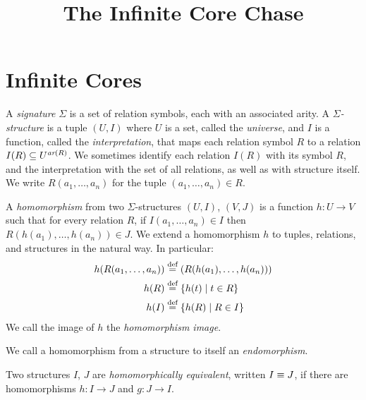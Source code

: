 \documentclass[acmsmall,screen,nonacm,review]{acmart}
\begin{document}
\title{The Infinite Core Chase}

\maketitle

\section{Infinite Cores}

\begin{definition}
    A {\em signature} $\Sigma$ is a set of relation symbols, 
    each with an associated arity.
    A {\em $\Sigma$-structure} is a tuple $(U, I)$ where $U$ is a set, 
    called the {\em universe}, and $I$ is a function, called the {\em interpretation},
    that maps each relation symbol $R$ to a relation $I(R) \subseteq U^{\textit{ar}(R)}$. 
    We sometimes identify each relation $I(R)$ with its symbol $R$, 
    and the interpretation with the set of all relations, 
    as well as with structure itself.
    We write $R(a_1, \ldots, a_n)$ for the tuple $(a_1, \ldots, a_n) \in R$.
\end{definition}

\begin{definition}
    A {\em homomorphism} from two $\Sigma$-structures $(U, I)$, $(V, J)$
    is a function $h: U \to V$ such that for every relation $R$,
    if $I(a_1, \ldots, a_n) \in I$ then $R(h(a_1), \ldots, h(a_n)) \in J$.
    We extend a homomorphism $h$ to tuples, relations, and structures 
    in the natural way.
    In particular: 
\begin{align*}
    h(R(a_1, \ldots, a_n)) & \stackrel{\text{def}}{=} (R(h(a_1), \ldots, h(a_n))) \\
    h(R) & \stackrel{\text{def}}{=} \{{h(t)}\mid{t \in R}\} \\
    h(I) & \stackrel{\text{def}}{=} \{{h(R)}\mid{R \in I}\}
\end{align*}
We call the image of $h$ the {\em homomorphism image}.
\end{definition}

\begin{definition}
    We call a homomorphism from a structure to itself an {\em endomorphism}.
\end{definition}

\begin{definition}
    Two structures $I$, $J$ are {\em homomorphically equivalent}, 
    written $I \equiv J$,
    if there are homomorphisms $h: I \to J$ and $g: J \to I$.
\end{definition}
\end{document}
